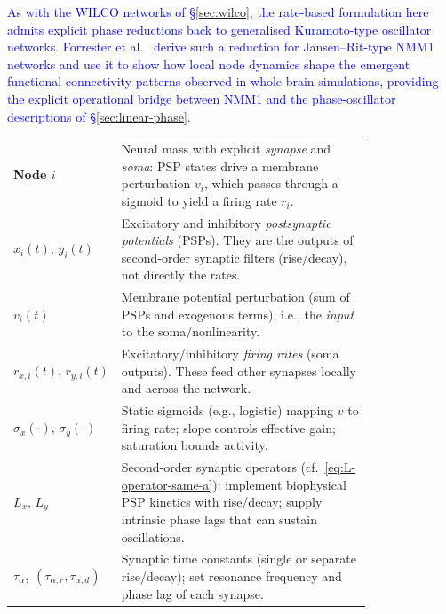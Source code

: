 \documentclass[12pt]{article}
\numberwithin{equation}{section}
\newcommand{\rev}[1]{\textcolor{blue}{#1}}
\begin{document}
\rev{As with the WILCO networks of \S\ref{sec:wilco}, the rate-based formulation here admits explicit phase reductions back to generalised Kuramoto-type oscillator networks. Forrester et al.~\cite{forrester_2020} derive such a reduction for Jansen--Rit-type NMM1 networks and use it to show how local node dynamics shape the emergent functional connectivity patterns observed in whole-brain simulations, providing the explicit operational bridge between NMM1 and the phase-oscillator descriptions of \S\ref{sec:linear-phase}.}
\begin{tcolorbox}[
  colback=gray!5,
  colframe=slate,
  colbacktitle=softblue!25,
  coltitle=softblue!60!black,
  fonttitle=\bfseries\small,
  title={\small \textit{NMM1  Network (Eq.~\ref{eq:nmm1-coupled-example})} \\ Whole-brain Simulations Parameters \& Physiological Meaning},
  boxrule=0.4pt, enhanced, sharp corners,
  left=4pt,right=4pt,top=3pt,bottom=3pt,
  boxsep=2pt, before skip=6pt, after skip=6pt
]
\scriptsize
\begin{tabular}{@{}l p{0.8\linewidth}@{}}
\textbf{Node $i$} & Neural mass with explicit \emph{synapse} and \emph{soma}: PSP states drive a membrane perturbation $v_i$, which passes through a sigmoid to yield a firing rate $r_i$.\\
\textbf{$x_i(t),\,y_i(t)$} & Excitatory and inhibitory \emph{postsynaptic potentials} (PSPs). They are the outputs of second‑order synaptic filters (rise/decay), not directly the rates.\\
\textbf{$v_i(t)$} & Membrane potential perturbation (sum of PSPs and exogenous terms), i.e., the \emph{input} to the soma/nonlinearity.\\
\textbf{$r_{x,i}(t),\,r_{y,i}(t)$} & Excitatory/inhibitory \emph{firing rates} (soma outputs). These feed other synapses locally and across the network.\\
\textbf{$\sigma_x(\cdot),\,\sigma_y(\cdot)$} & Static sigmoids (e.g., logistic) mapping $v$ to firing rate; slope controls effective gain; saturation bounds activity.\\
\textbf{$L_x,\,L_y$} & Second‑order synaptic operators (cf.\ \eqref{eq:L-operator-same-a}): implement biophysical PSP kinetics with rise/decay; supply intrinsic phase lags that can sustain oscillations.\\
\textbf{$\tau_{\alpha}$, $(\tau_{\alpha,r},\tau_{\alpha,d})$} & Synaptic time constants (single or separate rise/decay); set resonance frequency and phase lag of each synapse.\\

\end{tabular}
\end{tcolorbox}
\end{document}
